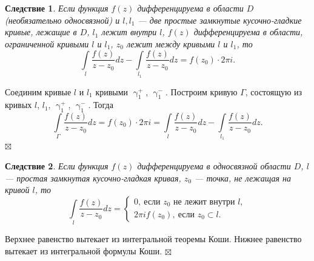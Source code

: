 \documentclass[a4paper, 12pt]{article}
\newenvironment{Proof} %
{\par\noindent{$\blacklozenge$}} %
{\hfill$\scriptstyle\boxtimes$}
\renewcommand{\gamma}{\upgamma}
\newcommand{\intl}{\int\limits_l}
\newtheorem*{cor}{Следствие}
\begin{document}
\begin{cor}
	Если функция $f(z)$ дифференцируема в области $D$ (необязательно односвязной) и $l, l_1$ --- две простые замкнутые кусочно-гладкие кривые, лежащие в $D$, $l_1$ лежит внутри $l$, $f(z)$ дифференцируема в области, ограниченной кривыми $l$ и $l_1$, $z_0$ лежит между кривыми $l$ и $l_1$, то $$\intl \dfrac{f(z)}{z-z_0}dz - \int\limits_{l_1}\dfrac{f(z)}{z-z_0}dz =f(z_0)\cdot 2\pi i.$$
\end{cor}\begin{Proof}
Соединим кривые $l$ и $l_1$ кривыми $\gamma_1^+$, $\gamma_1^-$.
Построим кривую $\Gamma$, состоящую из кривых $l$, $l_1$, $\gamma_1^+$, $\gamma_1^-$. Тогда $$ \int\limits_{\Gamma}\dfrac{f(z)}{z-z_0}dz = f(z_0)\cdot 2\pi i = \intl \dfrac{f(z)}{z-z_0}dz - \int\limits_{l_1}\dfrac{f(z)}{z-z_0}dz.$$
\end{Proof}
\begin{cor}
	Если функция $f(z)$ дифференцируема в односвязной области $D$, $l$ --- простая замкнутая кусочно-гладкая кривая, $z_0$ --- точка, не лежащая на кривой $l$, то $$\intl \dfrac{f(z)}{z-z_0}dz =\begin{cases}
		0,\ \text{если } z_0 \text{ не лежит внутри } l,\\
		2\pi i f(z_0),\ \text{если } z_0 \subset l. 
	\end{cases}$$
\end{cor}\begin{Proof}
Верхнее равенство вытекает из интегральной теоремы Коши. Нижнее равенство вытекает из интегральной формулы Коши.
\end{Proof}
\end{document}

